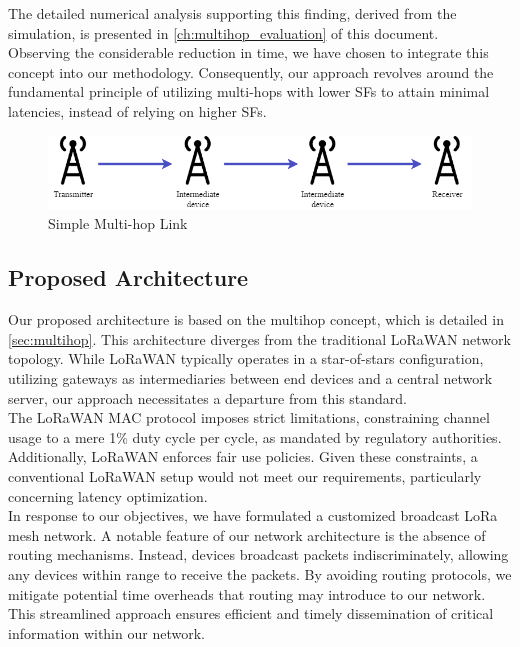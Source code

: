 The detailed numerical analysis supporting this finding, derived from the simulation, is presented in \autoref{ch:multihop_evaluation} of this document.\\

Observing the considerable reduction in time, we have chosen to integrate this concept into our methodology. Consequently, our approach revolves around the fundamental principle of utilizing multi-hops with lower \ac{SF}s to attain minimal latencies, instead of relying on higher \ac{SF}s.

\begin{figure}[htp!]
    \centering
    \includegraphics[scale=0.5]{images/simple_multihop.png}
    \caption{Simple Multi-hop Link }
    \label{fig:simple_multihop}
\end{figure}

\subsection{Proposed Architecture}
\label{sec:architecture}
\hspace{12pt} Our proposed architecture is based on the multihop concept, which is detailed in \autoref{sec:multihop}. This architecture diverges from the traditional LoRaWAN network topology. While LoRaWAN typically operates in a star-of-stars configuration, utilizing gateways as intermediaries between end devices and a central network server, our approach necessitates a departure from this standard.\\

The LoRaWAN MAC protocol imposes strict limitations, constraining channel usage to a mere 1$\%$ duty cycle per cycle, as mandated by regulatory authorities. Additionally, LoRaWAN enforces fair use policies. Given these constraints, a conventional LoRaWAN setup would not meet our requirements, particularly concerning latency optimization.\\

In response to our objectives, we have formulated a customized broadcast LoRa mesh network. A notable feature of our network architecture is the absence of routing mechanisms. Instead, devices broadcast packets indiscriminately, allowing any devices within range to receive the packets. By avoiding routing protocols, we mitigate potential time overheads that routing may introduce to our network. This streamlined approach ensures efficient and timely dissemination of critical information within our network.\\

